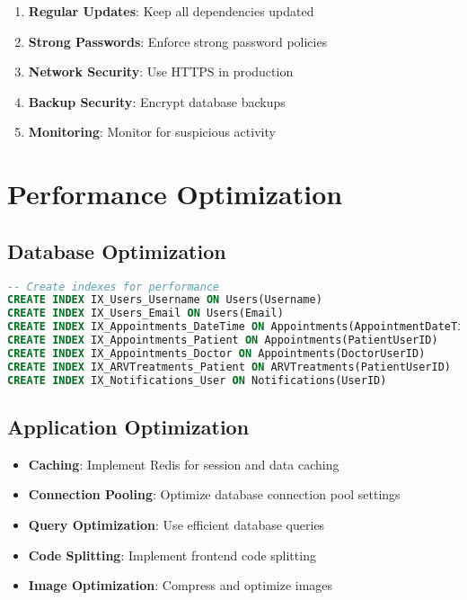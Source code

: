 \documentclass[12pt,a4paper]{article}
\begin{document}
\begin{enumerate}
    \item \textbf{Regular Updates}: Keep all dependencies updated
    \item \textbf{Strong Passwords}: Enforce strong password policies
    \item \textbf{Network Security}: Use HTTPS in production
    \item \textbf{Backup Security}: Encrypt database backups
    \item \textbf{Monitoring}: Monitor for suspicious activity
\end{enumerate}

\section{Performance Optimization}

\subsection{Database Optimization}

\begin{lstlisting}[language=SQL, caption=Database Indexes]
-- Create indexes for performance
CREATE INDEX IX_Users_Username ON Users(Username)
CREATE INDEX IX_Users_Email ON Users(Email)
CREATE INDEX IX_Appointments_DateTime ON Appointments(AppointmentDateTime)
CREATE INDEX IX_Appointments_Patient ON Appointments(PatientUserID)
CREATE INDEX IX_Appointments_Doctor ON Appointments(DoctorUserID)
CREATE INDEX IX_ARVTreatments_Patient ON ARVTreatments(PatientUserID)
CREATE INDEX IX_Notifications_User ON Notifications(UserID)
\end{lstlisting}

\subsection{Application Optimization}

\begin{itemize}
    \item \textbf{Caching}: Implement Redis for session and data caching
    \item \textbf{Connection Pooling}: Optimize database connection pool settings
    \item \textbf{Query Optimization}: Use efficient database queries
    \item \textbf{Code Splitting}: Implement frontend code splitting
    \item \textbf{Image Optimization}: Compress and optimize images
\end{itemize}
\end{document}
